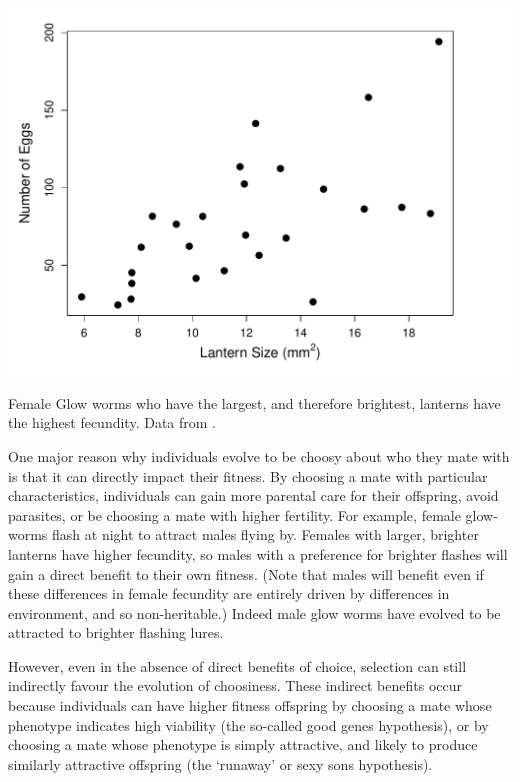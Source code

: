 \begin{marginfigure}
\begin{center}
\includegraphics[width= \textwidth]{Journal_figs/Quant_gen/glow_worm_flashes/glow_worm_flashes.pdf}
\end{center}
\caption{Female Glow worms who have the largest, and therefore
  brightest, lanterns have the highest fecundity. Data from
  \citet{hopkins2015m}.  } \label{fig:glow_worms_lantern}
\end{marginfigure}


One major reason why individuals evolve to be choosy about who they mate with is that it can directly impact their fitness. By choosing a mate with
particular characteristics, individuals can gain more parental care for
their offspring, avoid parasites, or be choosing a mate with higher fertility. For example,  female glow-worms flash at night to attract males flying by. Females with larger, brighter lanterns have higher fecundity, so
males with a preference for brighter flashes will gain a direct benefit to their own fitness. (Note that males will benefit even if these differences in female fecundity are entirely driven by differences in environment, and so non-heritable.) Indeed male glow worms have evolved to be attracted to brighter
flashing lures.  

However, even in the absence of direct benefits of choice, selection can still indirectly favour the evolution of choosiness. These
indirect benefits occur because individuals can have higher fitness
offspring by choosing a mate whose phenotype indicates high viability
(the so-called good genes hypothesis), or by choosing a mate whose
phenotype is simply attractive, and likely to produce similarly
attractive offspring (the `runaway' or sexy sons hypothesis).

